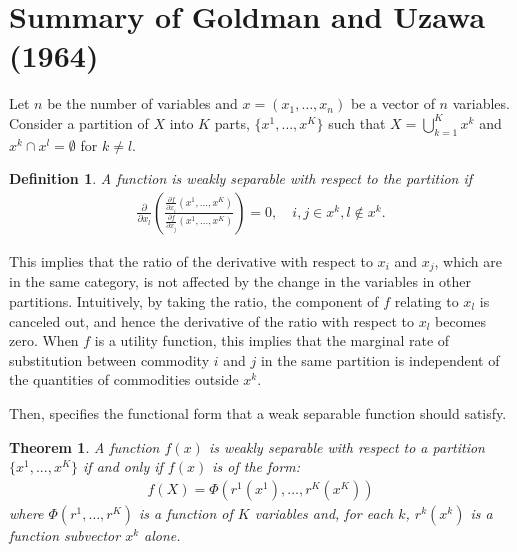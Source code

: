 \documentclass[11pt, a4paper]{article}
\newtheorem{theorem}{Theorem}
\newtheorem{definition}{Definition}
\theoremstyle{remark}
\begin{document}
\section{Summary of Goldman and Uzawa (1964)}\label{appendix:summary_goldman_uzawa}

Let $n$ be the number of variables and $x = (x_{1},\ldots, x_{n})$ be a vector of $n$ variables.
Consider a partition of $X$ into $K$ parts, $\{x^1, \ldots, x^K\}$ such that $X = \bigcup_{k=1}^K x^k$ and $x^k \cap x^l = \emptyset$ for $k\ne l$.
\begin{definition}\label{def:weal_separable}
    A function is weakly separable with respect to the partition if 
    \begin{align}
        \frac{\partial}{\partial x_l}\left(\frac{\frac{\partial f}{\partial x_i}(x^1, \ldots, x^K)}{\frac{\partial f}{\partial x_j}(x^1, \ldots, x^K)}\right) = 0, \quad i,j\in x^k, l \notin x^k.
    \end{align}
\end{definition}
This implies that the ratio of the derivative with respect to $x_i$ and $x_j$, which are in the same category, is not affected by the change in the variables in other partitions.
Intuitively, by taking the ratio, the component of $f$ relating to $x_l$ is canceled out, and hence the derivative of the ratio with respect to $x_l$ becomes zero.
When $f$ is a utility function, this implies that the marginal rate of substitution between commodity $i$ and $j$ in the same partition is independent of the quantities of commodities outside $x^k$.

Then, \citet{goldmanNote1964} specifies the functional form that a weak separable function should satisfy.
\begin{theorem}\label{thorem_2_GU}
    A function $f(x)$ is weakly separable with respect to a partition $\{x^1, .. ., x^K\}$ if and only if $f(x)$ is of the form: 
    \begin{align}
        f(X) = \Phi(r^1(x^{1}),\ldots, r^K(x^{K})   )
    \end{align} where $\Phi(r^1,\ldots, r^K)$ is a function of $K$ variables and, for each $k$, $r^k(x^{k})$ is a function subvector $x^{k}$ alone.
\end{theorem}
\end{document}
